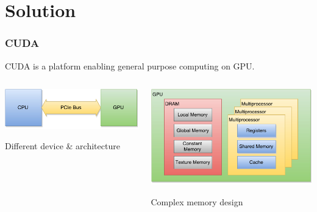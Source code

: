 \documentclass[czech]{beamer}
\begin{document}
	\section{Solution}
	\begin{frame}
		\frametitle{CUDA}
		 CUDA is a platform enabling general purpose computing on GPU.
		 
		 \bigskip
		\begin{columns}[c]
			\begin{column}{.45\textwidth}
				\centering
				\includegraphics[width=\textwidth]{hpc}
				
				\medskip
				\small{Different device \& architecture}
			\end{column}
			\hfill\vline\hfill
			\begin{column}{.45\textwidth}
				\centering
				\includegraphics[width=\textwidth]{memory}
				
				\medskip
				\small{Complex memory design}
			\end{column}
		\end{columns}
	\end{frame}
	
\end{document}
